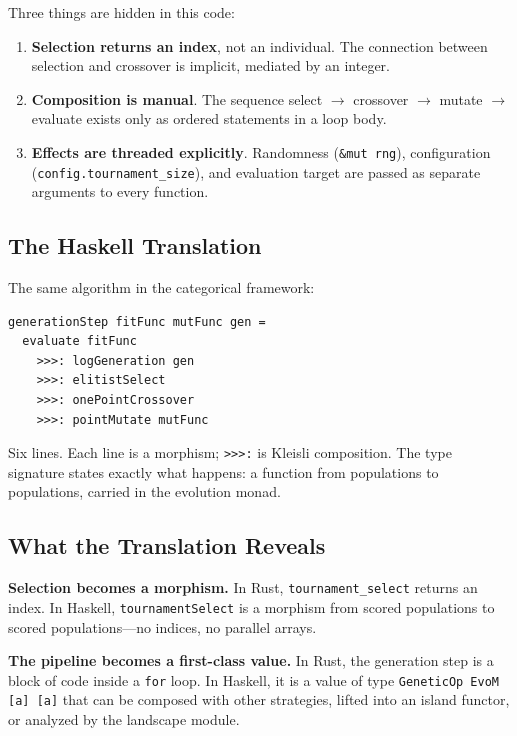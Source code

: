\documentclass[dvipsnames,format=sigconf,anonymous=true,review=false]{acmart}
\begin{document}
Three things are hidden in this code:

\begin{enumerate}[nosep]
  \item \textbf{Selection returns an index}, not an individual. The connection between selection and crossover is implicit, mediated by an integer.
  \item \textbf{Composition is manual}. The sequence select $\to$ crossover $\to$ mutate $\to$ evaluate exists only as ordered statements in a loop body.
  \item \textbf{Effects are threaded explicitly}. Randomness (\texttt{\&mut rng}), configuration (\texttt{config.tournament\_size}), and evaluation target are passed as separate arguments to every function.
\end{enumerate}

\subsection{The Haskell Translation}

The same algorithm in the categorical framework:

\begin{lstlisting}[style=haskellstyle]
generationStep fitFunc mutFunc gen =
  evaluate fitFunc
    >>>: logGeneration gen
    >>>: elitistSelect
    >>>: onePointCrossover
    >>>: pointMutate mutFunc
\end{lstlisting}

Six lines. Each line is a morphism; \texttt{>{>}{>}:} is Kleisli composition. The type signature states exactly what happens: a function from populations to populations, carried in the evolution monad.

\subsection{What the Translation Reveals}

\textbf{Selection becomes a morphism.} In Rust, \texttt{tournament\_select} returns an index. In Haskell, \texttt{tournamentSelect} is a morphism from scored populations to scored populations---no indices, no parallel arrays.

\textbf{The pipeline becomes a first-class value.} In Rust, the generation step is a block of code inside a \texttt{for} loop. In Haskell, it is a value of type \texttt{GeneticOp EvoM [a] [a]} that can be composed with other strategies, lifted into an island functor, or analyzed by the landscape module.
\end{document}
